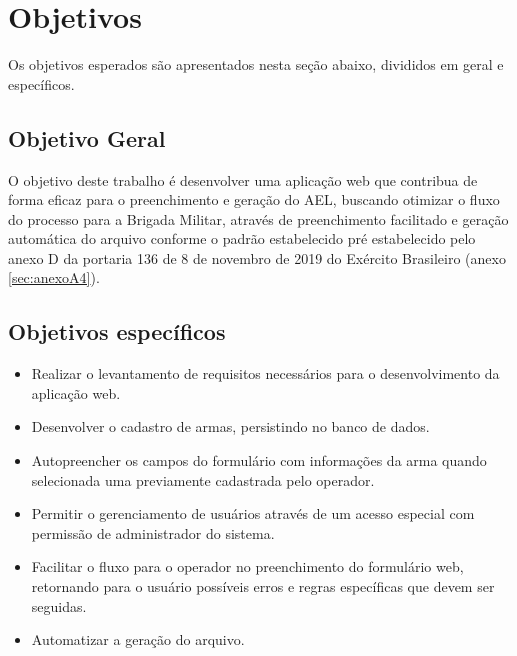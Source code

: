 \section{Objetivos}
Os objetivos esperados são apresentados nesta seção abaixo, divididos em geral e específicos. 

\subsection{Objetivo Geral}
O objetivo deste trabalho é desenvolver uma aplicação web que contribua de forma eficaz para o preenchimento e geração do AEL, buscando otimizar o fluxo do processo para a Brigada Militar, através de preenchimento facilitado e geração automática do arquivo conforme o padrão estabelecido pré estabelecido pelo anexo D da portaria 136 de 8 de novembro de 2019 do Exército Brasileiro (anexo \ref{sec:anexoA4}).

\subsection{Objetivos específicos}
\begin{itemize}
    \item Realizar o levantamento de requisitos necessários para o desenvolvimento da aplicação web. 
    \item Desenvolver o cadastro de armas, persistindo no banco de dados.
    \item Autopreencher os campos do formulário com informações da arma quando selecionada uma previamente cadastrada pelo operador.
    \item Permitir o gerenciamento de usuários através de um acesso especial com permissão de administrador do sistema.
    \item Facilitar o  fluxo para o operador no preenchimento do formulário web, retornando para o usuário possíveis erros e regras específicas que devem ser seguidas.
    \item Automatizar a geração do arquivo.
\end{itemize}  
